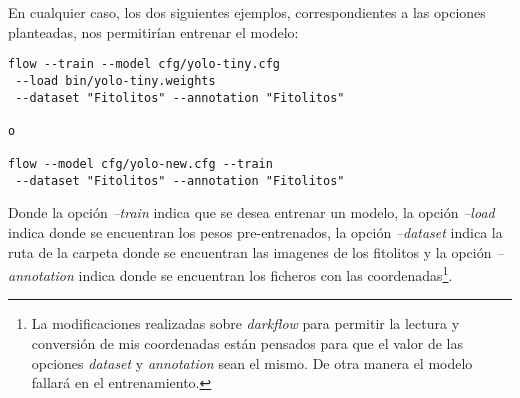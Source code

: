 En cualquier caso, los dos siguientes ejemplos, correspondientes a las opciones planteadas, nos permitirían entrenar el modelo:

\begin{verbatim}
flow --train --model cfg/yolo-tiny.cfg
 --load bin/yolo-tiny.weights
 --dataset "Fitolitos" --annotation "Fitolitos"

o

flow --model cfg/yolo-new.cfg --train
 --dataset "Fitolitos" --annotation "Fitolitos"
\end{verbatim}

Donde la opción \textit{--train} indica que se desea entrenar un modelo, la opción \textit{--load} indica donde se encuentran los pesos pre-entrenados, la opción \textit{--dataset} indica la ruta de la carpeta donde se encuentran las imagenes de los fitolitos y la opción \textit{--annotation} indica donde se encuentran los ficheros con las coordenadas\footnote{La modificaciones realizadas sobre \textit{darkflow} para permitir la lectura y conversión de mis coordenadas están pensados para que el valor de las opciones \textit{dataset} y \textit{annotation} sean el mismo. De otra manera el modelo fallará en el entrenamiento.}.


\begin{comment}
\section{Pruebas del sistema}
\end{comment}
